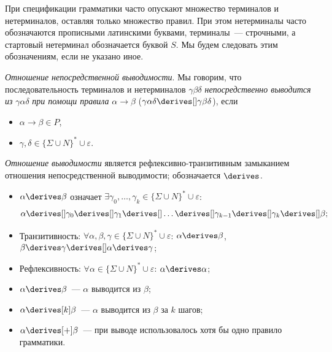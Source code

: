 При спецификации грамматики часто опускают множество терминалов и нетерминалов, оставляя только множество правил.
При этом нетерминалы часто обозначаются прописными латинскими буквами, терминалы~--- строчными, а стартовый нетерминал обозначается буквой $S$.
Мы будем следовать этим обозначениям, если не указано иное.

\begin{definition}
    \label{def derivability in CFG}
    \emph{Отношение непосредственной выводимости}. Мы говорим, что последовательность терминалов и нетерминалов $\gamma \beta \delta$ \emph{непосредственно выводится из} $\gamma \alpha \delta$ \emph{при помощи правила} $\alpha \rightarrow \beta$ ($\gamma \alpha \delta \derives[] \gamma \beta \delta$), если
    \begin{itemize}
        \item $\alpha \rightarrow \beta \in P$,
        \item $\gamma, \delta \in \{\Sigma \cup N\}^* \cup {\varepsilon}$.
    \end{itemize}
\end{definition}

\begin{definition}
    \emph{Отношение выводимости} является рефлексивно-транзитивным замыканием отношения непосредственной выводимости; обозначается $\derives$.
    \begin{itemize}
        \item $\alpha \derives \beta$ означает $\exists \gamma_0, \dots, \gamma_k \in \{\Sigma \cup N\}^* \cup {\varepsilon}$:
              \[ \alpha \derives[] \gamma_0 \derives[] \gamma_1 \derives[] \dots \derives[] \gamma_{k-1} \derives[] \gamma_{k} \derives[] \beta;\]
        \item Транзитивность: $\forall \alpha, \beta, \gamma \in \{\Sigma \cup N\}^* \cup {\varepsilon}$: $\alpha \derives \beta$, $\beta \derives \gamma \derives[] \alpha \derives \gamma$;
        \item Рефлексивность: $\forall \alpha \in \{\Sigma \cup N\}^* \cup {\varepsilon}$: $\alpha \derives \alpha$;
        \item $\alpha \derives \beta$~--- $\alpha$ выводится из $\beta$;
        \item $\alpha \derives[k] \beta$~--- $\alpha$ выводится из $\beta$ за $k$ шагов;
        \item $\alpha \derives[+] \beta$~--- при выводе использовалось хотя бы одно правило грамматики.
    \end{itemize}
\end{definition}


